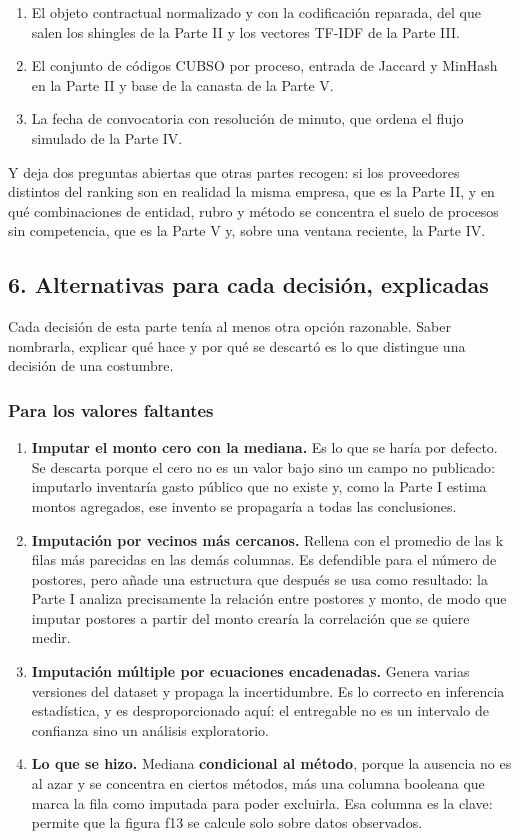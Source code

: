 \documentclass[11pt]{article}
\begin{document}
\begin{enumerate}
  \item El objeto contractual normalizado y con la codificación reparada, del que salen los shingles de la Parte II y los vectores TF-IDF de la Parte III.
  \item El conjunto de códigos CUBSO por proceso, entrada de Jaccard y MinHash en la Parte II y base de la canasta de la Parte V.
  \item La fecha de convocatoria con resolución de minuto, que ordena el flujo simulado de la Parte IV.
\end{enumerate}
Y deja dos preguntas abiertas que otras partes recogen: si los proveedores distintos del ranking son en realidad la misma empresa, que es la Parte II, y en qué combinaciones de entidad, rubro y método se concentra el suelo de procesos sin competencia, que es la Parte V y, sobre una ventana reciente, la Parte IV.

\subsection*{6. Alternativas para cada decisión, explicadas}
Cada decisión de esta parte tenía al menos otra opción razonable. Saber nombrarla, explicar qué hace y por qué se descartó es lo que distingue una decisión de una costumbre.

\subsubsection*{Para los valores faltantes}
\begin{enumerate}
  \item \textbf{Imputar el monto cero con la mediana.} Es lo que se haría por defecto. Se descarta porque el cero no es un valor bajo sino un campo no publicado: imputarlo inventaría gasto público que no existe y, como la Parte I estima montos agregados, ese invento se propagaría a todas las conclusiones.
  \item \textbf{Imputación por vecinos más cercanos.} Rellena con el promedio de las k filas más parecidas en las demás columnas. Es defendible para el número de postores, pero añade una estructura que después se usa como resultado: la Parte I analiza precisamente la relación entre postores y monto, de modo que imputar postores a partir del monto crearía la correlación que se quiere medir.
  \item \textbf{Imputación múltiple por ecuaciones encadenadas.} Genera varias versiones del dataset y propaga la incertidumbre. Es lo correcto en inferencia estadística, y es desproporcionado aquí: el entregable no es un intervalo de confianza sino un análisis exploratorio.
  \item \textbf{Lo que se hizo.} Mediana \textbf{condicional al método}, porque la ausencia no es al azar y se concentra en ciertos métodos, más una columna booleana que marca la fila como imputada para poder excluirla. Esa columna es la clave: permite que la figura f13 se calcule solo sobre datos observados.
\end{enumerate}
\end{document}
